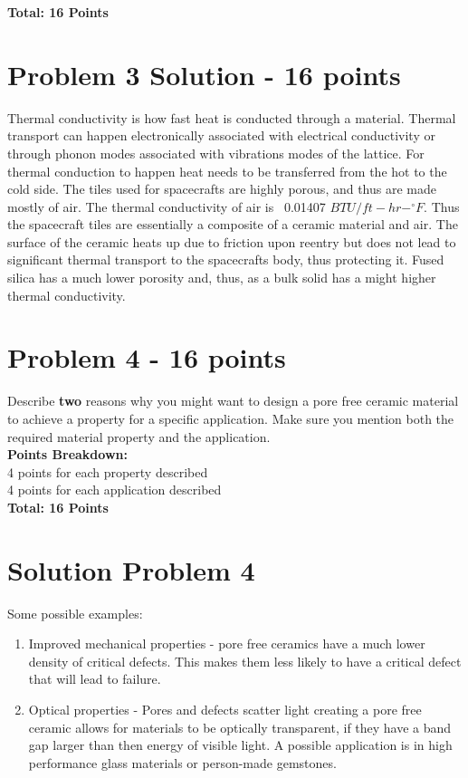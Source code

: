 \documentclass[12pt,letterpaper]{article}
\begin{document}
\textbf{Total: 16  Points}

\section*{Problem 3 Solution - 16 points}

Thermal conductivity is how fast heat is conducted through a material. Thermal transport can happen electronically associated with electrical conductivity or through phonon modes associated with vibrations modes of the lattice. For thermal conduction to happen heat needs to be transferred from the hot to the cold side. The tiles used for spacecrafts are highly porous, and thus are made mostly of air. The thermal conductivity of air is ~0.01407 $BTU/ft-hr-^{\circ}F$. Thus the spacecraft tiles are essentially a composite of a ceramic material and air. The surface of the ceramic heats up due to friction upon reentry but does not lead to significant thermal transport to the spacecrafts body, thus protecting it. Fused silica has a much lower porosity and, thus, as a bulk solid has a might higher thermal conductivity.  

\newpage
\section*{Problem 4 - 16 points}

Describe \textbf{two} reasons why you might want to design a pore free ceramic material to achieve a property for a specific application. Make sure you mention both the required material property and the application. \\

\textbf{Points Breakdown:}\\[12pt]
4 points for each property described\\
4 points for each application described\\[6 pt]
\textbf{Total: 16 Points}

\section*{Solution Problem 4}

Some possible examples:
\begin{enumerate}
    \item Improved mechanical properties - pore free ceramics have a much lower density of critical defects. This makes them less likely to have a critical defect that will lead to failure. 
    \item Optical properties - Pores and defects scatter light creating a pore free ceramic allows for materials to be optically transparent, if they have a band gap larger than then energy of visible light. A possible application is in high performance glass materials or person-made gemstones. 
\end{enumerate}
\end{document}
